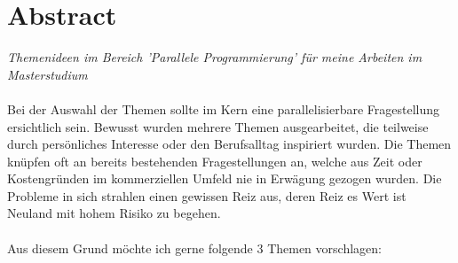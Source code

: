 \documentclass{article}
\begin{document}
\section*{Abstract}
\textit{Themenideen im Bereich 'Parallele Programmierung' für meine Arbeiten im Masterstudium} \\
\vspace{5pt} \\
Bei der Auswahl der Themen sollte im Kern eine parallelisierbare Fragestellung ersichtlich sein. Bewusst wurden mehrere Themen ausgearbeitet, die teilweise durch persönliches Interesse oder den Berufsalltag inspiriert wurden. Die Themen knüpfen oft an bereits bestehenden Fragestellungen an, welche aus Zeit oder Kostengründen im kommerziellen Umfeld nie in Erwägung gezogen wurden. Die Probleme in sich strahlen einen gewissen Reiz aus, deren Reiz es Wert ist Neuland mit hohem Risiko zu begehen. \\
\vspace{1pt} \\
Aus diesem Grund möchte ich gerne folgende 3 Themen vorschlagen:
\end{document}
